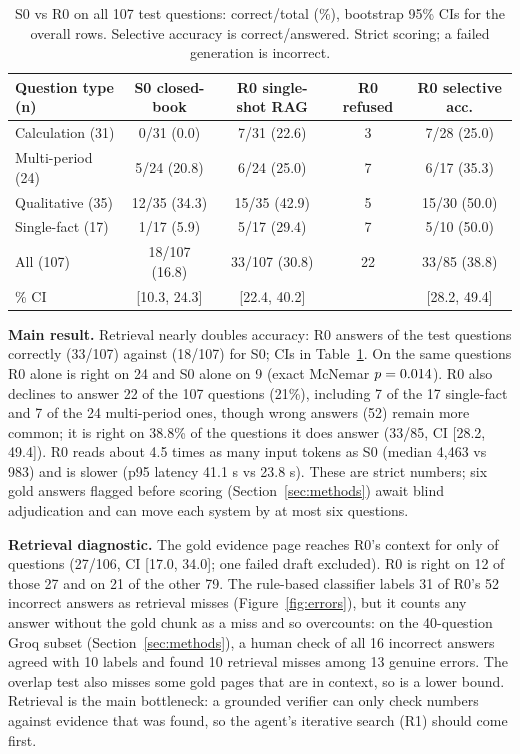 \begin{table}[h]
\centering\small
\caption{S0 vs R0 on all 107 test questions: correct/total (\%), bootstrap 95\% CIs for the overall rows. Selective accuracy is correct/answered. Strict scoring; a failed generation is incorrect.}
\label{tab:main}
\begin{tabular}{@{}lcccc@{}}
\toprule
Question type (n) & S0 closed-book & R0 single-shot RAG & R0 refused & R0 selective acc. \\
\midrule
Calculation (31) & 0/31 (0.0) & 7/31 (22.6) & 3 & 7/28 (25.0) \\
Multi-period (24) & 5/24 (20.8) & 6/24 (25.0) & 7 & 6/17 (35.3) \\
Qualitative (35) & 12/35 (34.3) & 15/35 (42.9) & 5 & 15/30 (50.0) \\
Single-fact (17) & 1/17 (5.9) & 5/17 (29.4) & 7 & 5/10 (50.0) \\
\midrule
All (107) & 18/107 (16.8) & 33/107 (30.8) & 22 & 33/85 (38.8) \\
\quad 95\% CI & [10.3, 24.3] & [22.4, 40.2] & & [28.2, 49.4] \\
\bottomrule
\end{tabular}
\end{table}

\textbf{Main result.} Retrieval nearly doubles accuracy: R0 answers \RzeroAll{} of the test questions correctly (33/107) against \SzeroAll{} (18/107) for S0; CIs in Table~\ref{tab:main}. On the same questions R0 alone is right on 24 and S0 alone on 9 (exact McNemar $p=0.014$). R0 also declines to answer 22 of the 107 questions (21\%), including 7 of the 17 single-fact and 7 of the 24 multi-period ones, though wrong answers (52) remain more common; it is right on 38.8\% of the questions it does answer (33/85, CI [28.2, 49.4]). R0 reads about 4.5 times as many input tokens as S0 (median 4{,}463 vs 983) and is slower (p95 latency 41.1 s vs 23.8 s). These are strict numbers; six gold answers flagged before scoring (Section~\ref{sec:methods}) await blind adjudication and can move each system by at most six questions.

\textbf{Retrieval diagnostic.} The gold evidence page reaches R0's context for only \GoldRetrieved{} of questions (27/106, CI [17.0, 34.0]; one failed draft excluded). R0 is right on 12 of those 27 and on 21 of the other 79. The rule-based classifier labels 31 of R0's 52 incorrect answers as retrieval misses (Figure~\ref{fig:errors}), but it counts any answer without the gold chunk as a miss and so overcounts: on the 40-question Groq subset (Section~\ref{sec:methods}), a human check of all 16 incorrect answers agreed with 10 labels and found 10 retrieval misses among 13 genuine errors. The overlap test also misses some gold pages that are in context, so \GoldRetrieved{} is a lower bound. Retrieval is the main bottleneck: a grounded verifier can only check numbers against evidence that was found, so the agent's iterative search (R1) should come first.

